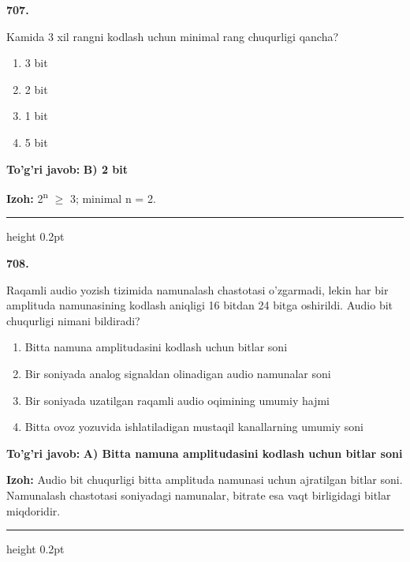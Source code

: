 \documentclass[10pt,a4paper,oneside]{article}
\begin{document}
\noindent\textbf{\color{ink}707.}
\par
Kamida 3 xil rangni kodlash uchun minimal rang chuqurligi qancha?
\begin{enumerate}[label=\Alph*),leftmargin=9mm]
\item 3 bit
\item 2 bit
\item 1 bit
\item 5 bit
\end{enumerate}
\begin{tcolorbox}[enhanced,breakable,colback=teal!4,colframe=teal!50!black,boxrule=0.5pt,arc=1.1mm,left=3mm,right=3mm,top=1.7mm,bottom=1.7mm,before skip=2mm,after skip=2mm]
\textbf{\color{teal}To'g'ri javob:} \textbf{B) 2 bit}
\par\smallskip
\textbf{Izoh:} 2\textsuperscript{n} \ensuremath{\geq} 3; minimal n = 2.
\end{tcolorbox}
\vspace{2mm}\hrule height 0.2pt \vspace{3mm}

\noindent\textbf{\color{ink}708.}
\par
Raqamli audio yozish tizimida namunalash chastotasi o'zgarmadi, lekin har bir amplituda namunasining kodlash aniqligi 16 bitdan 24 bitga oshirildi. Audio bit chuqurligi nimani bildiradi?
\begin{enumerate}[label=\Alph*),leftmargin=9mm]
\item Bitta namuna amplitudasini kodlash uchun bitlar soni
\item Bir soniyada analog signaldan olinadigan audio namunalar soni
\item Bir soniyada uzatilgan raqamli audio oqimining umumiy hajmi
\item Bitta ovoz yozuvida ishlatiladigan mustaqil kanallarning umumiy soni
\end{enumerate}
\begin{tcolorbox}[enhanced,breakable,colback=teal!4,colframe=teal!50!black,boxrule=0.5pt,arc=1.1mm,left=3mm,right=3mm,top=1.7mm,bottom=1.7mm,before skip=2mm,after skip=2mm]
\textbf{\color{teal}To'g'ri javob:} \textbf{A) Bitta namuna amplitudasini kodlash uchun bitlar soni}
\par\smallskip
\textbf{Izoh:} Audio bit chuqurligi bitta amplituda namunasi uchun ajratilgan bitlar soni. Namunalash chastotasi soniyadagi namunalar, bitrate esa vaqt birligidagi bitlar miqdoridir.
\end{tcolorbox}
\vspace{2mm}\hrule height 0.2pt \vspace{3mm}
\end{document}
